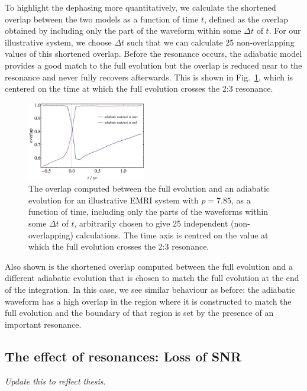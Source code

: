 \documentclass[aps,prd,amsfonts,amssymb,amsmath,nofootinbib,showpacs,superscriptaddress,twocolumn]{revtex4}
\newcommand{\figref}[1]{Fig.\ \ref{fig:#1}}
\begin{document}
To highlight the dephasing more quantitatively, we calculate the shortened overlap between the two models as a function of time $t$, defined as the overlap obtained by including only the part of the waveform within some $\Delta t$ of $t$. For our illustrative system, we choose $\Delta t$ such that we can calculate 25 non-overlapping values of this shortened overlap. Before the resonance occurs, the adiabatic model provides a good match to the full evolution but the overlap is reduced near to the resonance and never fully recovers afterwards. This is shown in \figref{overlap-dephasing}, which is centered on the time at which the full evolution crosses the 2:3 resonance.

\begin{figure}[htbp]
\centering
\includegraphics[width=0.46\textwidth]{Fig_overlap_vs_time}
\caption{\label{fig:overlap-dephasing}The overlap computed between the full evolution and an adiabatic evolution for an illustrative EMRI system with $p=7.85$, as a function of time, including only the parts of the waveforms within some $\Delta t$ of $t$, arbitrarily chosen to give 25 independent (non-overlapping) calculations. The time axis is centred on the value at which the full evolution crosses the 2:3 resonance.}
\end{figure}

Also shown is the shortened overlap computed between the full evolution and a different adiabatic evolution that is chosen to match the full evolution at the end of the integration. In this case, we see similar behaviour as before: the adiabatic waveform has a high overlap in the region where it is constructed to match the full evolution and the boundary of that region is set by the presence of an important resonance.

\subsection{The effect of resonances: Loss of SNR}
\label{sec:SNRloss}

\emph{Update this to reflect thesis.}
\end{document}
